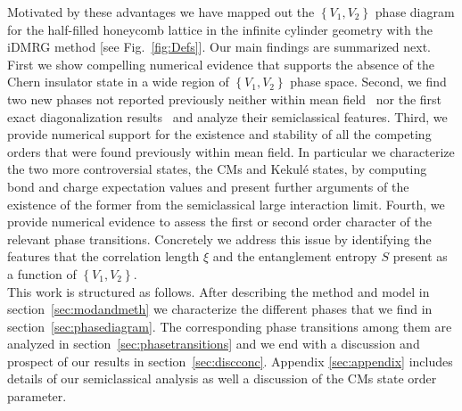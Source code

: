 \documentclass[aps,prx,10pt,twocolumn,floatfix,superscriptaddress,showpacs,numerical,footinbib]{revtex4-1}
\begin{document}
%
Motivated by these advantages we have mapped out the $\left\lbrace V_{1},V_{2}\right\rbrace$ phase diagram for the half-filled honeycomb lattice in the infinite cylinder geometry
with the iDMRG method [see Fig.~\ref{fig:Defs}].
%
Our main findings are summarized next.
%
First we show compelling numerical evidence that supports the absence of the Chern insulator state in a wide region of $\left\lbrace V_{1},V_{2}\right\rbrace$ phase space.
%
Second, we find two new phases not reported previously neither within mean field~\cite{RQHZ08,WF10,GCC13} 
nor the first exact diagonalization results~\cite{GGNVC13,DH14,DCH14} and analyze their semiclassical features.
%
Third, we provide numerical support for the existence and stability of all the competing orders that were found previously within mean field.
%
In particular we characterize the two more controversial states, the CMs and Kekul\'{e} states, by computing bond and charge expectation values
and present further arguments of the existence of the former from the semiclassical large interaction limit.
%
Fourth, we provide numerical evidence to assess the first or second order character of the relevant phase transitions.
%
Concretely we address this issue by identifying the features that the correlation length $\xi$ and the entanglement entropy $S$ present as a function of $\left\lbrace V_{1},V_{2}\right\rbrace$.\\

This work is structured as follows. 
%
After describing the method and model in section~\ref{sec:modandmeth} we
characterize the different phases that we find in section~\ref{sec:phasediagram}.
%
The corresponding phase transitions among them are analyzed in section~\ref{sec:phasetransitions}
and we end with a discussion and prospect of our results in section~\ref{sec:discconc}.
%
Appendix \ref{sec:appendix} includes details of our semiclassical analysis as well a discussion of the CMs state order parameter.
\end{document}
